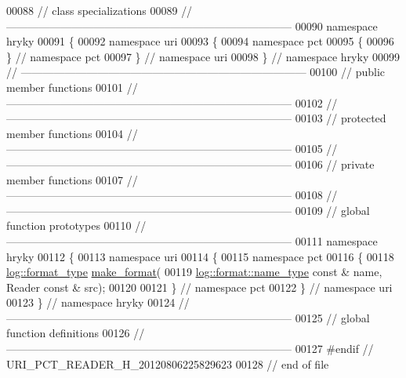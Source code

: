 \begin{DoxyCode}
00088 \textcolor{comment}{// class specializations}
00089 \textcolor{comment}{//
      ------------------------------------------------------------------------------}
00090 \textcolor{keyword}{namespace }hryky
00091 \{
00092 \textcolor{keyword}{namespace }uri
00093 \{
00094 \textcolor{keyword}{namespace }pct
00095 \{
00096 \} \textcolor{comment}{// namespace pct}
00097 \} \textcolor{comment}{// namespace uri}
00098 \} \textcolor{comment}{// namespace hryky}
00099 \textcolor{comment}{//
      ------------------------------------------------------------------------------}
00100 \textcolor{comment}{// public member functions}
00101 \textcolor{comment}{//
      ------------------------------------------------------------------------------}
00102 \textcolor{comment}{//
      ------------------------------------------------------------------------------}
00103 \textcolor{comment}{// protected member functions}
00104 \textcolor{comment}{//
      ------------------------------------------------------------------------------}
00105 \textcolor{comment}{//
      ------------------------------------------------------------------------------}
00106 \textcolor{comment}{// private member functions}
00107 \textcolor{comment}{//
      ------------------------------------------------------------------------------}
00108 \textcolor{comment}{//
      ------------------------------------------------------------------------------}
00109 \textcolor{comment}{// global function prototypes}
00110 \textcolor{comment}{//
      ------------------------------------------------------------------------------}
00111 \textcolor{keyword}{namespace }hryky
00112 \{
00113 \textcolor{keyword}{namespace }uri
00114 \{
00115 \textcolor{keyword}{namespace }pct
00116 \{
00118     \hyperlink{namespacehryky_1_1log_ad50448c3f934f1eacd5c1bcffe8111e1}{log::format_type} \hyperlink{namespacehryky_1_1uri_a4c47d905f62ff90b7026c9f3f6544a9b}{make_format}(
00119         \hyperlink{namespacehryky_1_1log_1_1format_ab7408d1e2ed2d648dbf9bba69eb74288}{log::format::name_type} \textcolor{keyword}{const} & name, Reader \textcolor{keyword}{const} & src);
00120 
00121 \} \textcolor{comment}{// namespace pct}
00122 \} \textcolor{comment}{// namespace uri}
00123 \} \textcolor{comment}{// namespace hryky}
00124 \textcolor{comment}{//
      ------------------------------------------------------------------------------}
00125 \textcolor{comment}{// global function definitions}
00126 \textcolor{comment}{//
      ------------------------------------------------------------------------------}
00127 \textcolor{preprocessor}{#endif // URI\_PCT\_READER\_H\_20120806225829623}
00128 \textcolor{preprocessor}{}\textcolor{comment}{// end of file}
\end{DoxyCode}
